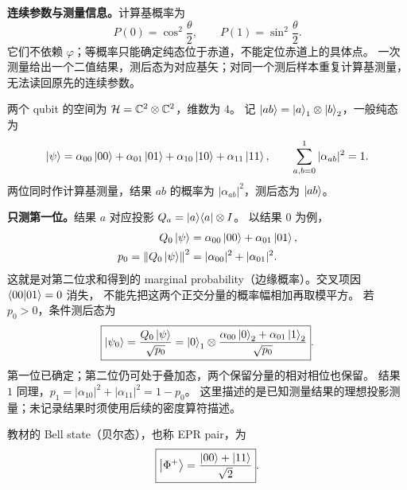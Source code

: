 \textbf{连续参数与测量信息。}计算基概率为
\begin{equation*}
  P(0)=\cos^2\frac\theta2,\qquad P(1)=\sin^2\frac\theta2.
\end{equation*}
它们不依赖 $\varphi$；等概率只能确定纯态位于赤道，不能定位赤道上的具体点。
一次测量给出一个二值结果，测后态为对应基矢；对同一个测后样本重复计算基测量，无法读回原先的连续参数。


两个 qubit 的空间为 $\mathcal{H}=\mathbb{C}^2\otimes\mathbb{C}^2$，维数为 $4$。
记 $\left|ab\right\rangle=\left|a\right\rangle_1\otimes\left|b\right\rangle_2$，一般纯态为
\begin{equation*}
  \left|\psi\right\rangle=\alpha_{00}\left|00\right\rangle+\alpha_{01}\left|01\right\rangle
  +\alpha_{10}\left|10\right\rangle+\alpha_{11}\left|11\right\rangle,\qquad
  \sum_{a,b=0}^1|\alpha_{ab}|^2=1.
\end{equation*}
两位同时作计算基测量，结果 $ab$ 的概率为 $|\alpha_{ab}|^2$，测后态为 $\left|ab\right\rangle$。

\textbf{只测第一位。}结果 $a$ 对应投影 $Q_a=\left|a\right\rangle\!\left\langle a\right|\otimes I$。
以结果 $0$ 为例，
\begin{align*}
  Q_0\left|\psi\right\rangle&=\alpha_{00}\left|00\right\rangle+\alpha_{01}\left|01\right\rangle,\\
  p_0=\left\lVert Q_0\left|\psi\right\rangle \right\rVert^2&=|\alpha_{00}|^2+|\alpha_{01}|^2.
\end{align*}
这就是对第二位求和得到的 marginal probability（边缘概率）。交叉项因 $\left\langle 00 \middle| 01 \right\rangle=0$ 消失，
不能先把这两个正交分量的概率幅相加再取模平方。
若 $p_0>0$，条件测后态为
\begin{equation*}
  \boxed{\left|\psi_0\right\rangle=\frac{Q_0\left|\psi\right\rangle}{\sqrt{p_0}}
  =\left|0\right\rangle_1\otimes\frac{\alpha_{00}\left|0\right\rangle_2+\alpha_{01}\left|1\right\rangle_2}{\sqrt{p_0}}}.
\end{equation*}
第一位已确定；第二位仍可处于叠加态，两个保留分量的相对相位也保留。
结果 $1$ 同理，$p_1=|\alpha_{10}|^2+|\alpha_{11}|^2=1-p_0$。
这里描述的是已知测量结果的理想投影测量；未记录结果时须使用后续的密度算符描述。

教材的 Bell state（贝尔态），也称 EPR pair，为
\begin{equation*}
  \boxed{\left|\Phi^+\right\rangle=\frac{\left|00\right\rangle+\left|11\right\rangle}{\sqrt2}}.
\end{equation*}

